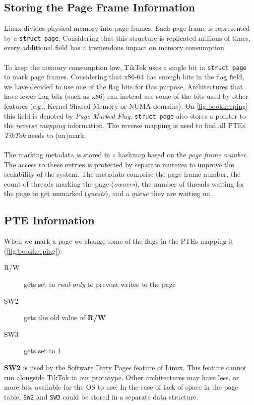 \subsection{Storing the Page Frame Information}
\label{subsec:frameinfo}
Linux divides physical memory into page frames. Each page frame is represented
by a \texttt{struct page}. Considering that this structure is replicated
millions of times, every additional field has a tremendous impact on memory
consumption.
\\
\\
To keep the memory consumption low, TikTok uses a single bit in \texttt{struct
page} to mark page frames. Considering that x86-64 has enough bits in the flag
field, we have decided to use one of the flag bits for this purpose.
Architectures that have fewer flag bits (such as x86) can instead use some of
the bits used by other features (e.g., Kernel Shared Memory or NUMA domains). On
\cref{fig:bookkeeping} this field is denoted by \emph{Page Marked Flag}.
\texttt{struct page} also stores a pointer to the \emph{reverse mapping}
information. The reverse mapping is used to find all PTEs \emph{TikTok} needs to
(un)mark.
\\
\\
The marking metadata is stored in a hashmap based on the \emph{page frame
number}. The access to these entries is protected by separate mutexes to improve
the scalability of the system. The metadata comprise the page frame number, the
count of threads marking the page (\emph{owners}), the number of threads waiting
for the page to get unmarked (\emph{guests}), and a \emph{queue} they are
waiting on. 

\subsection{PTE Information}
\label{subsec:pageinfo}

When we mark a page we change some of the flags in the PTEs mapping it
(\cref{fig:bookkeeping}):

\begin{description}
  \item[R/W] gets set to \emph{read-only} to prevent writes to the page
  \item[SW2] gets the old value of \textbf{R/W}
  \item[SW3] gets set to 1 
\end{description}

\textbf{SW2} is used by the Software Dirty Pages
feature of Linux. This feature cannot run alongside TikTok in our prototype.
Other architectures may have less, or more bits available for the OS to use. In
the case of lack of space in the page table, \texttt{SW2} and \texttt{SW3} could
be stored in a separate data structure.

